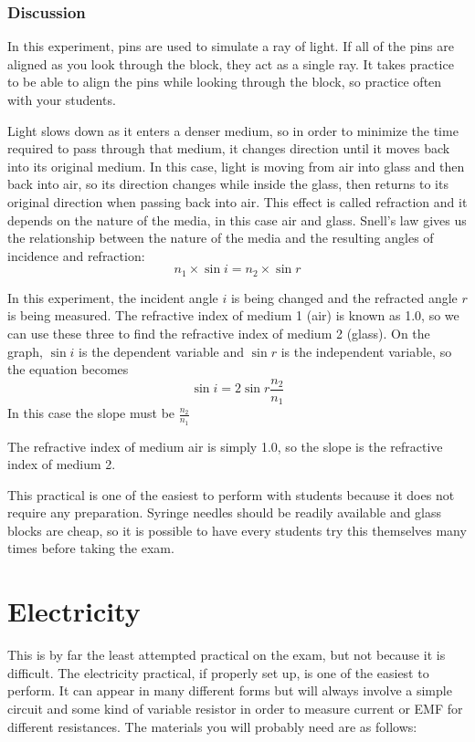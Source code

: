\documentclass[12pt,a4paper]{report}
\begin{document}
\subsubsection{Discussion}

In this experiment, pins are used to simulate a ray of light. If all of the pins are
aligned as you look through the block, they act as a single ray. It takes practice to be able
to align the pins while looking through the block, so practice often with your students.

Light slows down as it enters a denser medium, so in order to minimize the time
required to pass through that medium, it changes direction until it moves back into its
original medium. In this case, light is moving from air into glass and then back into air,
so its direction changes while inside the glass, then returns to its original direction when
passing back into air. This effect is called refraction and it depends on the nature of the
media, in this case air and glass. Snell’s law gives us the relationship between the nature
of the media and the resulting angles of incidence and refraction:
$$n_1 \times \sin{i} = n_2 \times \sin{r}$$

In this experiment, the incident angle $i$ is being changed and the refracted angle $r$
is being measured. The refractive index of medium 1 (air) is known as 1.0, so we can use
these three to find the refractive index of medium 2 (glass). On the graph, $\sin{i}$ is the
dependent variable and $\sin{r}$ is the independent variable, so the equation becomes
$$\sin{i} = 2 \sin{r} \frac{n_2}{n_1}$$
In this case the slope must be $\frac{n_2}{n_1}$

The refractive index of medium air is simply 1.0, so the slope is the refractive index of
medium 2.

This practical is one of the easiest to perform with students because it does not
require any preparation. Syringe needles should be readily available and glass blocks are
cheap, so it is possible to have every students try this themselves many times before
taking the exam.

\section{Electricity}

This is by far the least attempted practical on the exam, but not because it is
difficult. The electricity practical, if properly set up, is one of the easiest to perform. It
can appear in many different forms but will always involve a simple circuit and some
kind of variable resistor in order to measure current or EMF for different resistances. The
materials you will probably need are as follows:
\end{document}
